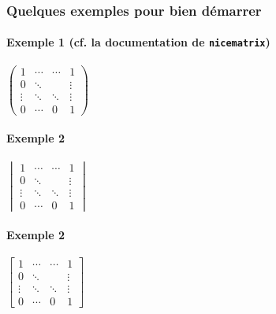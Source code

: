 \documentclass[12pt,a4paper]{article}
\begin{document}
\subsubsection{Quelques exemples pour bien démarrer}

\paragraph{Exemple 1 (cf. la documentation de \texttt{nicematrix})}

\begin{latexex}
$\begin{pmatrix}
    1      & \cdots & \cdots & 1      \\
    0      & \ddots &        & \vdots \\
    \vdots & \ddots & \ddots & \vdots \\
    0      & \cdots & 0      & 1
\end{pmatrix}$
\end{latexex}




\paragraph{Exemple 2}

\begin{latexex}
$\begin{vmatrix}
    1      & \cdots & \cdots & 1      \\
    0      & \ddots &        & \vdots \\
    \vdots & \ddots & \ddots & \vdots \\
    0      & \cdots & 0      & 1
\end{vmatrix}$
\end{latexex}




\paragraph{Exemple 2}

\begin{latexex}
$\begin{bmatrix}
    1      & \cdots & \cdots & 1      \\
    0      & \ddots &        & \vdots \\
    \vdots & \ddots & \ddots & \vdots \\
    0      & \cdots & 0      & 1
\end{bmatrix}$
\end{latexex}
\end{document}
